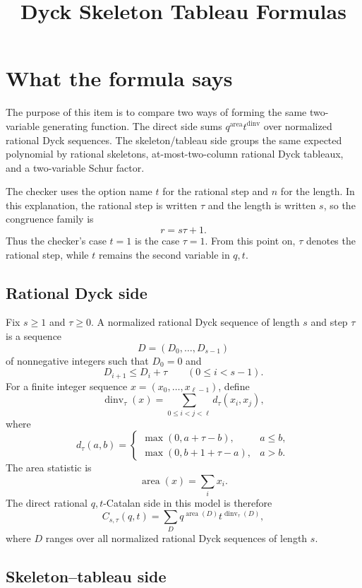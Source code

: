 \documentclass{article}
\title{Dyck Skeleton Tableau Formulas}
\author{}
\date{}
\DeclareMathOperator{\area}{area}
\DeclareMathOperator{\dinv}{dinv}
\begin{document}
\maketitle

\section{What the formula says}

The purpose of this item is to compare two ways of forming the same
two-variable generating function.  The direct side sums
\(q^{\area}t^{\dinv}\) over normalized rational Dyck sequences.  The
skeleton/tableau side groups the same expected polynomial by rational
skeletons, at-most-two-column rational Dyck tableaux, and a two-variable
Schur factor.

The checker uses the option name \(t\) for the rational step and \(n\) for the
length.  In this explanation, the rational step is written \(\tau\) and the
length is written \(s\), so the congruence family is
\[
  r=s\tau+1.
\]
Thus the checker's case \(t=1\) is the case \(\tau=1\).  From this point on,
\(\tau\) denotes the rational step, while \(t\) remains the second variable in
\(q,t\).

\subsection{Rational Dyck side}

Fix \(s\geq 1\) and \(\tau\geq 0\).  A normalized rational Dyck sequence of
length \(s\) and step \(\tau\) is a sequence
\[
  D=(D_0,\ldots,D_{s-1})
\]
of nonnegative integers such that \(D_0=0\) and
\[
  D_{i+1}\leq D_i+\tau
  \qquad(0\leq i<s-1).
\]
For a finite integer sequence \(x=(x_0,\ldots,x_{\ell-1})\), define
\[
  \dinv_\tau(x)=
  \sum_{0\leq i<j<\ell} d_\tau(x_i,x_j),
\]
where
\[
  d_\tau(a,b)=
  \begin{cases}
    \max(0,a+\tau-b),& a\leq b,\\
    \max(0,b+1+\tau-a),& a>b.
  \end{cases}
\]
The area statistic is
\[
  \area(x)=\sum_i x_i.
\]
The direct rational \(q,t\)-Catalan side in this model is therefore
\[
  C_{s,\tau}(q,t)
  =
  \sum_D q^{\area(D)}t^{\dinv_\tau(D)},
\]
where \(D\) ranges over all normalized rational Dyck sequences of length
\(s\).

\subsection{Skeleton--tableau side}
\end{document}
